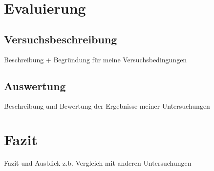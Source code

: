 

\chapter{Evaluierung}
\section{Versuchsbeschreibung}
Beschreibung + Begründung für meine Versuchsbedingungen
\section{Auswertung}
Beschreibung und Bewertung der Ergebnisse meiner Untersuchungen

\chapter{Fazit}
Fazit und Ausblick
z.b. Vergleich mit anderen Untersuchungen


